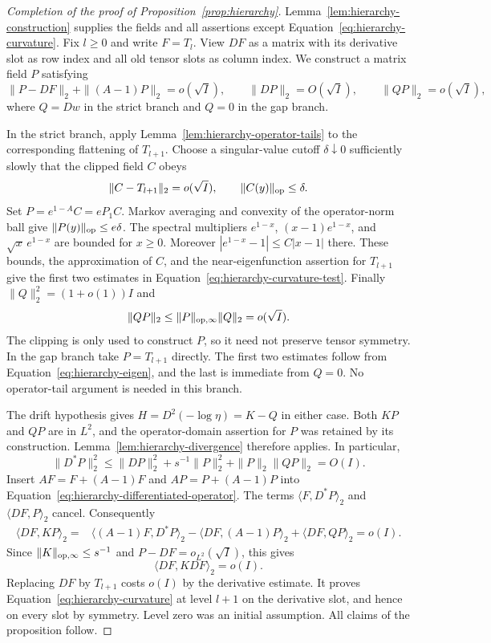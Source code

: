 \begin{proof}[Completion of the proof of Proposition~\ref{prop:hierarchy}]
Lemma~\ref{lem:hierarchy-construction} supplies the fields and all
assertions except Equation~\eqref{eq:hierarchy-curvature}.  Fix $l\ge0$
and write $F=T_l$.  View $DF$ as a matrix with its derivative slot as
row index and all old tensor slots as column index.  We construct a
matrix field $P$ satisfying
\begin{equation}\label{eq:hierarchy-curvature-test}
 \|P-DF\|_2+\|(A-1)P\|_2=o(\sqrt I),\qquad
 \|DP\|_2=O(\sqrt I),\qquad \|QP\|_2=o(\sqrt I),
\end{equation}
where $Q=Dw$ in the strict branch and $Q=0$ in the gap branch.

In the strict branch, apply Lemma~\ref{lem:hierarchy-operator-tails}
to the corresponding flattening of $T_{l+1}$.  Choose a singular-value
cutoff $\delta\downarrow0$ sufficiently slowly that the clipped field
$C$ obeys
\[
 \|C-T_{l+1}\|_2=o(\sqrt I),\qquad
 \|C(y)\|_{\mathrm{op}}\le\delta.
\]
Set $P=e^{1-A}C=eP_1C$.  Markov averaging and convexity of the
operator-norm ball give $\|P(y)\|_{\mathrm{op}}\le e\delta$.  The spectral
multipliers $e^{1-x}$, $(x-1)e^{1-x}$, and $\sqrt x\,e^{1-x}$ are
bounded for $x\ge0$.  Moreover
$|e^{1-x}-1|\le C|x-1|$ there.  These bounds, the approximation of
$C$, and the near-eigenfunction assertion for $T_{l+1}$ give the first
two estimates in Equation~\eqref{eq:hierarchy-curvature-test}.
Finally $\|Q\|_2^2=(1+o(1))I$ and
\[
 \|QP\|_2\le\|P\|_{\mathrm{op},\infty}\|Q\|_2=o(\sqrt I).
\]
The clipping is only used to construct $P$, so it need not preserve
tensor symmetry.  In the gap branch take $P=T_{l+1}$ directly.
The first two estimates follow from
Equation~\eqref{eq:hierarchy-eigen}, and the last is immediate from
$Q=0$.  No operator-tail argument is needed in this branch.

The drift hypothesis gives $H=D^2(-\log\eta)=K-Q$ in either case.
Both $KP$ and $QP$ are in $L^2$, and the operator-domain assertion for
$P$ was retained by its construction.  Lemma~\ref{lem:hierarchy-divergence}
therefore applies.  In particular,
\[
 \|D^*P\|_2^2
 \le\|DP\|_2^2+s^{-1}\|P\|_2^2+\|P\|_2\|QP\|_2=O(I).
\]
Insert $AF=F+(A-1)F$ and $AP=P+(A-1)P$ into
Equation~\eqref{eq:hierarchy-differentiated-operator}.  The terms
$\langle F,D^*P\rangle_2$ and $\langle DF,P\rangle_2$ cancel.
Consequently
\begin{align*}
 \langle DF,KP\rangle_2
 ={}&\langle(A-1)F,D^*P\rangle_2
     -\langle DF,(A-1)P\rangle_2
     +\langle DF,QP\rangle_2
 =o(I).
\end{align*}
Since $\|K\|_{\mathrm{op},\infty}\le s^{-1}$ and
$P-DF=o_{L^2}(\sqrt I)$, this gives
\[
 \langle DF,KDF\rangle_2=o(I).
\]
Replacing $DF$ by $T_{l+1}$ costs $o(I)$ by the derivative estimate.
It proves Equation~\eqref{eq:hierarchy-curvature} at level $l+1$ on
the derivative slot, and hence on every slot by symmetry.  Level zero
was an initial assumption.  All claims of the proposition follow.
\end{proof}

